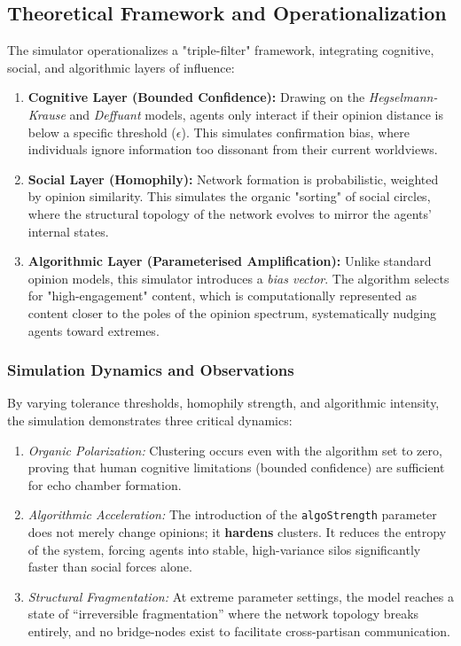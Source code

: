 \documentclass[12pt,a4paper]{report}
\begin{document}
\subsection{Theoretical Framework and Operationalization}
The simulator operationalizes a "triple-filter" framework, integrating cognitive, social, and algorithmic layers of influence:
\begin{enumerate}
  \item \textbf{Cognitive Layer (Bounded Confidence):} Drawing on the \textit{Hegselmann-Krause} and \textit{Deffuant} models, agents only interact if their opinion distance is below a specific threshold ($\epsilon$). This simulates confirmation bias, where individuals ignore information too dissonant from their current worldviews.
  \item \textbf{Social Layer (Homophily):} Network formation is probabilistic, weighted by opinion similarity. This simulates the organic "sorting" of social circles, where the structural topology of the network evolves to mirror the agents' internal states.
  \item \textbf{Algorithmic Layer (Parameterised Amplification):} Unlike standard opinion models, this simulator introduces a \textit{bias vector}. The algorithm selects for "high-engagement" content, which is computationally represented as content closer to the poles of the opinion spectrum, systematically nudging agents toward extremes.
\end{enumerate}

\subsubsection{Simulation Dynamics and Observations}
By varying tolerance thresholds, homophily strength, and algorithmic intensity, the simulation demonstrates three critical dynamics:

\begin{enumerate}
    \item \textit{Organic Polarization:} Clustering occurs even with the algorithm set to zero, proving that human cognitive limitations (bounded confidence) are sufficient for echo chamber formation.
    \item \textit{Algorithmic Acceleration:} The introduction of the \texttt{algoStrength} parameter does not merely change opinions; it \textbf{hardens} clusters. It reduces the entropy of the system, forcing agents into stable, high-variance silos significantly faster than social forces alone.
    \item \textit{Structural Fragmentation:} At extreme parameter settings, the model reaches a state of ``irreversible fragmentation'' where the network topology breaks entirely, and no bridge-nodes exist to facilitate cross-partisan communication.
\end{enumerate}
\end{document}
